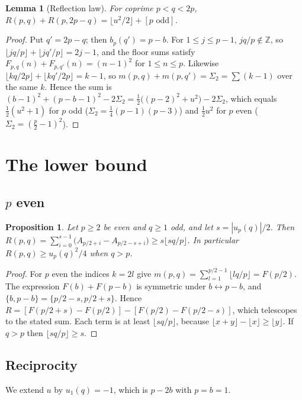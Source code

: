 \documentclass[11pt,reqno]{amsart}
\theoremstyle{plain}
\newtheorem{proposition}[theorem]{Proposition}
\newtheorem{lemma}[theorem]{Lemma}
\theoremstyle{definition}
\newcommand{\Z}{\mathbb{Z}}
\begin{document}
\begin{lemma}[Reflection law]\label{lem:refl}
For coprime $p<q<2p$, $R(p,q)+R(p,2p-q)=\lfloor u^2/2\rfloor+[p\text{ odd}]$.
\end{lemma}

\begin{proof}
Put $q'=2p-q$; then $b_p(q')=p-b$. For $1\le j\le p-1$, $jq/p\notin\Z$, so
$\lfloor jq/p\rfloor+\lfloor jq'/p\rfloor=2j-1$, and the floor sums satisfy
$F_{p,q}(n)+F_{p,q'}(n)=(n-1)^2$ for $1\le n\le p$. Likewise
$\lfloor kq/2p\rfloor+\lfloor kq'/2p\rfloor=k-1$, so $m(p,q)+m(p,q')=\Sigma_2=\sum(k-1)$ over the same
$k$. Hence the sum is $(b-1)^2+(p-b-1)^2-2\Sigma_2=\frac12\bigl((p-2)^2+u^2\bigr)-2\Sigma_2$, which
equals $\frac12(u^2+1)$ for $p$ odd ($\Sigma_2=\frac14(p-1)(p-3)$) and $\frac12u^2$ for $p$ even
($\Sigma_2=(\frac p2-1)^2$).
\end{proof}

\section{The lower bound}\label{sec:bound}

\subsection{\texorpdfstring{$p$ even}{p even}}

\begin{proposition}\label{prop:even}
Let $p\ge2$ be even and $q\ge1$ odd, and let $s=|u_p(q)|/2$. Then
$R(p,q)=\sum_{i=0}^{s-1}\bigl(A_{p/2+i}-A_{p/2-s+i}\bigr)\ge s\lfloor sq/p\rfloor$. In particular
$R(p,q)\ge u_p(q)^2/4$ when $q>p$.
\end{proposition}

\begin{proof}
For $p$ even the indices $k=2l$ give $m(p,q)=\sum_{l=1}^{p/2-1}\lfloor lq/p\rfloor=F(p/2)$. The
expression $F(b)+F(p-b)$ is symmetric under $b\leftrightarrow p-b$, and $\{b,p-b\}=\{p/2-s,p/2+s\}$.
Hence $R=[F(p/2+s)-F(p/2)]-[F(p/2)-F(p/2-s)]$, which telescopes to the stated sum. Each term is at
least $\lfloor sq/p\rfloor$, because $\lfloor x+y\rfloor-\lfloor x\rfloor\ge\lfloor y\rfloor$. If
$q>p$ then $\lfloor sq/p\rfloor\ge s$.
\end{proof}

\subsection{Reciprocity}
We extend $u$ by $u_1(q)=-1$, which is $p-2b$ with $p=b=1$.
\end{document}
